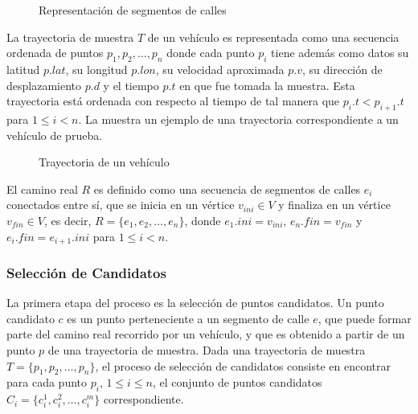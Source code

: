 \begin{figure}[h*]
	\centering
	
	\caption{\label{fig:segmentos_de_calle} Representación de segmentos de calles}	
\end{figure}

La trayectoria de muestra $T$ de un vehículo es representada como una secuencia ordenada de puntos $p_1, p_2, \dots, p_n$ donde cada punto $p_i$ tiene además como datos su latitud $p.lat$, su longitud $p.lon$, su velocidad aproximada $p.v$, su dirección de desplazamiento $p.d$ y el tiempo $p.t$ en que fue tomada la muestra. Esta trayectoria está ordenada con respecto al tiempo de tal manera que $p_i.t < p_{i + 1}.t$ para $1 \le i < n$. La  muestra un ejemplo de una trayectoria correspondiente a un vehículo de prueba.

\begin{figure}[h*]
	\centering
	
	\caption{\label{fig:trayectoria} Trayectoria de un vehículo}	
\end{figure}

El camino real $R$ es definido como una secuencia de segmentos de calles $e_i$ conectados entre sí, que se inicia en un vértice $v_{ini} \in V$ y finaliza en un vértice $v_{fin} \in V$, es decir, $R = \{ e_1, e_2, \dots, e_n \}$, donde $e_1.ini = v_{ini}$, $e_n.fin = v_{fin}$ y $e_i.fin = e_{i + 1}.ini$ para $1 \le i < n$.

\subsubsection{Selección de Candidatos}
\label{seleccion_de_candidatos}

La primera etapa del proceso es la selección de puntos candidatos. Un punto candidato $c$ es un punto perteneciente a un segmento de calle $e$, que puede formar parte del camino real recorrido por un vehículo, y que es obtenido a partir de un punto $p$ de una trayectoria de muestra. Dada una trayectoria de muestra $T = \{p_1, p_2, \dots, p_n\}$, el proceso de selección de candidatos consiste en encontrar para cada punto $p_i$, $1\le i\le n$, el conjunto de puntos candidatos $C_i = \{c_{i}^{1}, c_{i}^{2}, \dots, c_{i}^{m}\}$ correspondiente.

